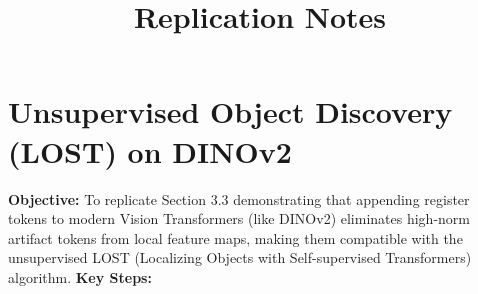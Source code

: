 \documentclass[12pt]{article}
\begin{document}
 
 
\title{Replication Notes}
\maketitle

\section{Unsupervised Object Discovery (LOST) on DINOv2}
\textbf{Objective:} To replicate Section 3.3 demonstrating that appending register tokens to modern Vision Transformers (like DINOv2) eliminates high-norm artifact tokens from local feature maps, making them compatible with the unsupervised LOST (Localizing Objects with Self-supervised Transformers) algorithm.
\textbf{Key Steps:}
\end{document}
